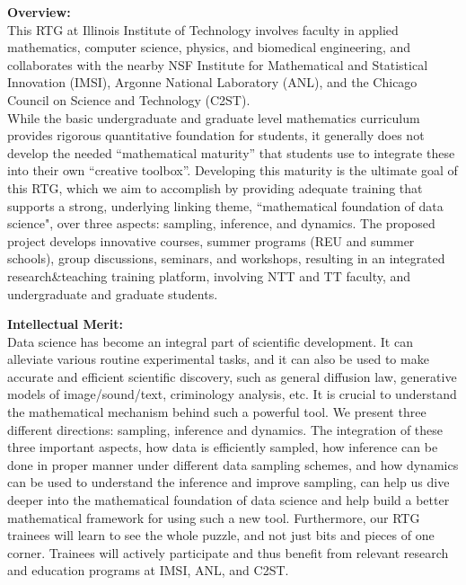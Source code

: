 \documentclass[11pt]{NSFamsart}
\begin{document}
%
\pagestyle{empty}
%
\noindent\textbf{\Large{Overview:}} \\
This RTG at Illinois Institute of Technology involves faculty in applied mathematics, computer science, physics, and biomedical engineering, and collaborates with the nearby NSF Institute for Mathematical and Statistical Innovation (IMSI), Argonne National Laboratory (ANL), and the Chicago Council on Science and Technology (C2ST). \\

\noindent While the basic undergraduate and graduate level mathematics curriculum provides rigorous quantitative foundation for students, it  generally does not develop the needed ``mathematical maturity'' that students use to integrate these into their own ``creative toolbox''. Developing this maturity is the ultimate goal of this RTG, which we aim to accomplish by providing adequate training that supports a strong, underlying linking theme, ``mathematical foundation of data science", over three aspects: sampling, inference, and dynamics. The proposed project develops  innovative courses, summer programs (REU and summer schools), group discussions, seminars, and workshops, resulting in %
 an integrated research\&teaching training platform, involving NTT and TT faculty, and undergraduate and graduate students. 

\noindent\textbf{\Large{Intellectual Merit:}} \\
Data science has become an integral part of scientific development.  It can alleviate various routine experimental tasks, and it can also be used to make accurate and efficient scientific discovery, such as general diffusion law, generative models of image/sound/text, criminology analysis, etc.  It is crucial to understand the mathematical mechanism behind such a powerful tool.  We present three different directions: sampling, inference and dynamics.  The integration of these three important aspects, how data is efficiently sampled, how inference can be done in proper manner under different data sampling schemes, and how dynamics can be used to understand the inference and improve sampling, can help us dive deeper into the mathematical foundation of data science and help build a better mathematical framework for using such a new tool.  Furthermore, our RTG trainees will learn to see the whole puzzle, and not just bits and pieces of one corner. Trainees will actively participate and thus benefit from relevant research and education programs at IMSI, ANL, and C2ST. \\
\end{document}
